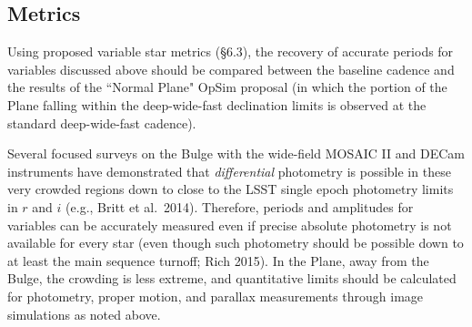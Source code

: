 




%
 \subsection{Metrics}
 \label{sec:\secname:metrics}
%

Using proposed variable star metrics (\S 6.3), the recovery of accurate periods for variables discussed above should be compared between the baseline cadence and the
results of the ``Normal Plane" OpSim proposal (in which the portion of the Plane falling within the deep-wide-fast declination limits is observed at the
standard deep-wide-fast cadence).

Several focused surveys on the Bulge with the wide-field MOSAIC II and DECam instruments have demonstrated that \emph{differential} photometry is possible in
these very crowded regions down to close to the LSST single epoch photometry limits in $r$ and $i$ (e.g., Britt et al.~2014). Therefore, periods and
amplitudes for variables can be accurately measured even if precise absolute photometry is not available for every star (even though such photometry should
be possible down to at least the main sequence turnoff; Rich 2015). In the Plane, away from the Bulge, the crowding is less extreme, and quantitative limits
should be calculated for photometry, proper motion, and parallax measurements through image simulations as noted above.

%
%




%
%
%

\navigationbar
